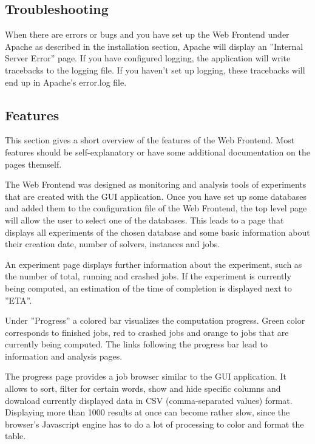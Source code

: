 \subsection{Troubleshooting}
\label{wf:troubleshooting}
When there are errors or bugs and you have set up the Web Frontend under Apache as described in the installation section, Apache will display an ''Internal Server Error'' page.
If you have configured logging, the application will write tracebacks to the logging file. If you haven't set up logging, these tracebacks will end up
in Apache's error.log file.

\subsection{Features}
This section gives a short overview of the features of the Web Frontend. Most features should be self-explanatory or have some additional documentation
on the pages themself.

The Web Frontend was designed as monitoring and analysis tools of experiments that are created with the GUI application. Once you have set up some databases and added
them to the configuration file of the Web Frontend, the top level page will allow the user to select one of the databases. This leads to a page that displays
all experiments of the chosen database and some basic information about their creation date, number of solvers, instances and jobs.

An experiment page displays further information about the experiment, such as the number of total, running and crashed jobs. If the experiment is currently
being computed, an estimation of the time of completion is displayed next to ''ETA''.

Under ''Progress'' a colored bar visualizes the computation progress.
Green color corresponds to finished jobs, red to crashed jobs and orange to jobs that are currently being computed. The links following the progress bar
lead to information and analysis pages.

The progress page provides a job browser similar to the GUI application. It allows to sort, filter for certain words, show and hide specific columns and download
currently displayed data in CSV (comma-separated values) format. Displaying more than 1000 results at once can become rather slow, since the browser's Javascript
engine has to do a lot of processing to color and format the table.

